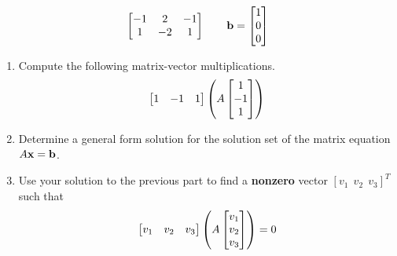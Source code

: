 \begin{tasks}[resume, style=enumerate]
\begin{displaymath}
\begin{bmatrix}
      -1 & 2 & -1 \\
      1 & -2 & 1
    \end{bmatrix}
    \qquad
    \mathbf b =  \begin{bmatrix} 1 \\ 0 \\ 0 \end{bmatrix} 
  \end{displaymath}
  \begin{enumerate}[label=(\alph*)]
  \item Compute the following matrix-vector multiplications.
    \begin{displaymath}
      \begin{bmatrix} 1 & {-1} & 1 \end{bmatrix}
      \left(
      A
       \begin{bmatrix} 1 \\ -1 \\ 1 \end{bmatrix} 
      \right)
    \end{displaymath}
\item Determine a general form solution for the solution
  set of the matrix equation $A \mathbf x = \mathbf b$.
\item Use your solution to the previous part to find a
  \textbf{nonzero} vector $[v_1 \ \ v_2 \ \ v_3]^T$ such that
  \begin{displaymath}
    \begin{bmatrix} v_1 & v_2 & v_3 \end{bmatrix}
    \left(
    A
     \begin{bmatrix} v_1 \\ v_2 \\ v_3 \end{bmatrix} 
    \right)
    = 0
  \end{displaymath}
\end{enumerate}
\end{tasks}
